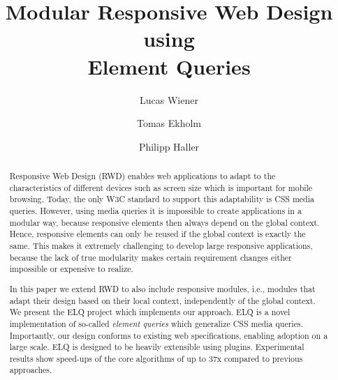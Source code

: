\documentclass[lnbip]{svmultln}
\newcommand{\elq}{ELQ}
\begin{document}
%
\mainmatter              %
%
\title{Modular Responsive Web Design using\\ Element Queries}
%
%
\author{Lucas Wiener%
\and Tomas Ekholm\and Philipp Haller}
%
%
%

\maketitle              %

\begin{abstract}        %
  Responsive Web Design (RWD) enables web applications to adapt to the characteristics of different devices such as screen size which is important for mobile browsing.
  Today, the only W3C standard to support this adaptability is CSS media queries.
  However, using media queries it is impossible to create applications in a modular way, because responsive elements then always depend on the global context.
  Hence, responsive elements can only be reused if the global context is exactly the same.
  This makes it extremely challenging to develop large responsive applications, because the lack of true modularity makes certain requirement changes either impossible or expensive to realize.

  In this paper we extend RWD to also include responsive modules, i.e., modules that adapt their design based on their local context, independently of the global context.
  We present the \elq{} project which implements our approach.
  \elq{} is a novel implementation of so-called \emph{element queries} which generalize CSS media queries.
  Importantly, our design conforms to existing web specifications, enabling adoption on a large scale.
  \elq{} is designed to be heavily extensible using plugins.
  Experimental results show speed-ups of the core algorithms of up to 37x compared to previous approaches.
\end{abstract}
%
\end{document}
